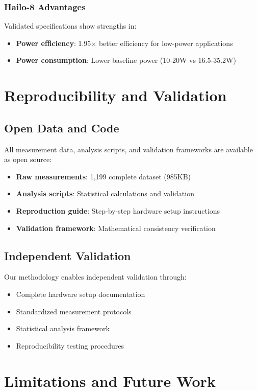\documentclass[12pt,draftcls,onecolumn]{IEEEtran}
\begin{document}
\subsubsection{Hailo-8 Advantages}
Validated specifications show strengths in:
\begin{itemize}
    \item \textbf{Power efficiency}: 1.95× better efficiency for low-power applications
    \item \textbf{Power consumption}: Lower baseline power (10-20W vs 16.5-35.2W)
\end{itemize}

\section{Reproducibility and Validation}

\subsection{Open Data and Code}
All measurement data, analysis scripts, and validation frameworks are available as open source:
\begin{itemize}
    \item \textbf{Raw measurements}: 1,199 complete dataset (985KB)
    \item \textbf{Analysis scripts}: Statistical calculations and validation
    \item \textbf{Reproduction guide}: Step-by-step hardware setup instructions
    \item \textbf{Validation framework}: Mathematical consistency verification
\end{itemize}

\subsection{Independent Validation}
Our methodology enables independent validation through:
\begin{itemize}
    \item Complete hardware setup documentation
    \item Standardized measurement protocols
    \item Statistical analysis framework
    \item Reproducibility testing procedures
\end{itemize}

\section{Limitations and Future Work}
\end{document}
